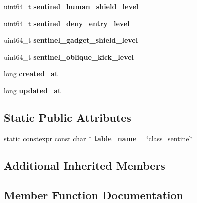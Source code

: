 \begin{DoxyCompactItemize}
\mbox{\label{structmods_1_1orm_1_1sentinel_a1cec1d768af77adf7cf192e884a7a03d}} 
uint64\+\_\+t {\bfseries sentinel\+\_\+human\+\_\+shield\+\_\+level}
\item 
\mbox{\label{structmods_1_1orm_1_1sentinel_a6cd882ed327e0d8eeaaf7a7d6d9b9ab2}} 
uint64\+\_\+t {\bfseries sentinel\+\_\+deny\+\_\+entry\+\_\+level}
\item 
\mbox{\label{structmods_1_1orm_1_1sentinel_a178b373bcaf8fd30a4f6325b5188ff22}} 
uint64\+\_\+t {\bfseries sentinel\+\_\+gadget\+\_\+shield\+\_\+level}
\item 
\mbox{\label{structmods_1_1orm_1_1sentinel_a08fa15298db1ff7b8c50989ae2649a34}} 
uint64\+\_\+t {\bfseries sentinel\+\_\+oblique\+\_\+kick\+\_\+level}
\item 
\mbox{\label{structmods_1_1orm_1_1sentinel_a1a761a3d983e8bc6353d955285f13f28}} 
long {\bfseries created\+\_\+at}
\item 
\mbox{\label{structmods_1_1orm_1_1sentinel_a19401c12257cd5faf59939e8f70e6fbb}} 
long {\bfseries updated\+\_\+at}
\end{DoxyCompactItemize}
\subsection*{Static Public Attributes}
\begin{DoxyCompactItemize}
\item 
\mbox{\label{structmods_1_1orm_1_1sentinel_a2bf880a2f876fcbb2d76a78babde4bbf}} 
static constexpr const char $\ast$ {\bfseries table\+\_\+name} = \char`\"{}class\+\_\+sentinel\char`\"{}
\end{DoxyCompactItemize}
\subsection*{Additional Inherited Members}


\subsection{Member Function Documentation}
\mbox{\label{structmods_1_1orm_1_1sentinel_aa01c7770d384a6461a7d886e1ac94d03}} 
